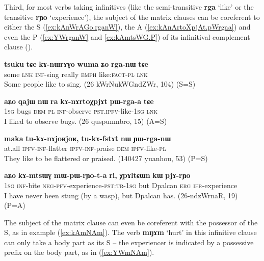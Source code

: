 \documentclass[oneside,a4paper,11pt]{article}
\newcommand{\ipa}[1]{\textbf{\phon#1}} %
\newcommand{\jpg}[2]{\ipa{#1} `#2'} %
\begin{document}
Third, for most verbs taking infinitives (like the semi-transitive \jpg{rga}{like} or the transitive \jpg{rɲo}{experience}), the subject of the matrix clauses can be coreferent to either the S  (\ref{ex:kAnWrAGo.rganW}), the A (\ref{ex:kAnArtoXpjAt.pWrgaa}) and even the P (\ref{ex:YWrganW} and \ref{ex:kAmtsWG.P})  of its infinitival complement clause (\citealt{jacques16relatives}).

 \begin{exe}
   \ex   \label{ex:kAnWrAGo.rganW} 
\gll
\ipa{tsuku}  	\ipa{tɕe}  	\ipa{kɤ-nɯrɤɣo}  	\ipa{wuma}  	\ipa{ʑo}  	\ipa{rga-nɯ}  	\ipa{tɕe}  \\
some \textsc{lnk} \textsc{inf}-sing really \textsc{emph} like:\textsc{fact-pl}  \textsc{lnk} \\
\glt Some people like to sing. (26 kWrNukWGndZWr, 104)  (S=S)
\end{exe}  
 
   \begin{exe}
   \ex   \label{ex:kAnArtoXpjAt.pWrgaa} 
\gll
  	\ipa{aʑo}  	\ipa{qajɯ}  	\ipa{nɯ} \ipa{ra}  	\ipa{kɤ-nɤrtoχpjɤt}  	\ipa{pɯ-rga-a}  	\ipa{tɕe}  	\\
  	\textsc{1sg} bugs \textsc{dem} \textsc{pl} \textsc{inf}-observe \textsc{pst.ipfv}-like-\textsc{1sg} \textsc{lnk}  \\
 \glt I liked to observe bugs. (26 quspunmbro, 15) (A=S)
     \end{exe}  
 
  \begin{exe}
   \ex   \label{ex:YWrganW} 
\gll
\ipa{maka}  	\ipa{tu-kɤ-nɤjoʁjoʁ,}  	\ipa{tu-kɤ-fstɤt}  	\ipa{nɯ}  	\ipa{ɲɯ-rga-nɯ}  \\
at.all \textsc{ipfv-inf}-flatter \textsc{ipfv-inf}-praise \textsc{dem} \textsc{ipfv}-like-\textsc{pl} \\
\glt They like to be flattered or praised. (140427 yuanhou, 53) (P=S)
    \end{exe}  
      \begin{exe}
   \ex   \label{ex:kAmtsWG.P} 
\gll 
\ipa{aʑo} 	\ipa{kɤ-mtsɯɣ} 	\ipa{mɯ-pɯ-rɲo-t-a} 	\ipa{ri,} 	\ipa{χpɤltɕɯn} 	\ipa{kɯ} 	\ipa{pjɤ-rɲo} 	
 \\
\textsc{1sg} \textsc{inf}-bite \textsc{neg-pfv}-experience-\textsc{pst:tr-1sg} but Dpalcan \textsc{erg} \textsc{ifr}-experience \\
\glt I have never been stung (by a wasp), but Dpalcan has. (26-ndzWrnaR, 19) (P=A)
    \end{exe}  

The subject of the matrix clause can even be coreferent with the possessor of the S, as in example (\ref{ex:kAmNAm}). The verb \ipa{mŋɤm} `hurt' in this infinitive clause can only take a body part as its S -- the experiencer is indicated by a possessive prefix on the body part, as in (\ref{ex:YWmNAm}).
 
\end{document}
